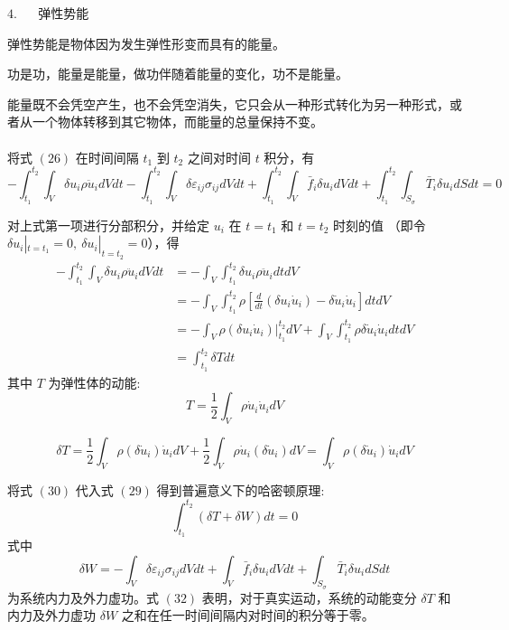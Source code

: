 \documentclass[12pt,a4paper]{article}
\begin{document}
$4$. ~~ 弹性势能

弹性势能是物体因为发生弹性形变而具有的能量。

功是功，能量是能量，做功伴随着能量的变化，功不是能量。

能量既不会凭空产生，也不会凭空消失，它只会从一种形式转化为另一种形式，或者从一个物体转移到其它物体，而能量的总量保持不变。\\

~ \\

将式 $(26)$ 在时间间隔 $t_1$ 到 $t_2$ 之间对时间 $t$ 积分，有
\begin{equation}
-\int_{t_1}^{t_2} \int_{V}\delta u_i\rho\ddot{u}_idVdt-\int_{t_1}^{t_2} \int_{V}\delta\varepsilon_{ij}\sigma_{ij}dVdt+\int_{t_1}^{t_2} \int_{V}\bar{f}_i\delta u_idVdt+\int_{t_1}^{t_2} \int_{S_{\sigma}}\bar{T}_i\delta u_idSdt=0
\end{equation}

对上式第一项进行分部积分，并给定 $u_i$ 在 $t=t_1$ 和 $t=t_2$ 时刻的值 （即令 $\delta u_i|_{t=t_1}=0,~\delta u_i|_{t=t_2}=0$），得
\begin{equation}
\begin{align}
-\int_{t_1}^{t_2} \int_{V}\delta u_i\rho\ddot{u}_idVdt & = -\int_{V} \int_{t_1}^{t_2}\delta u_i\rho\ddot{u}_idtdV \\
& = -\int_{V} \int_{t_1}^{t_2}\rho\left[\frac{d}{dt}(\delta u_i\dot{u}_i)-\delta\dot{u}_i\dot{u}_i\right]dtdV \\
& = -\int_{V}\rho(\delta u_i\dot{u}_i)|^{t_2}_{t_1}dV+\int_{V} \int_{t_1}^{t_2}\rho\delta\dot{u}_i\dot{u}_idtdV \\
& = \int_{t_1}^{t_2} \delta Tdt
\end{align}
\end{equation}
其中 $T$ 为弹性体的动能:
\begin{equation}
T=\frac{1}{2}\int_{V}\rho\dot{u}_i\dot{u}_idV
\end{equation}

$$
\delta T=\frac{1}{2}\int_{V}\rho(\delta\dot{u}_i)\dot{u}_idV+\frac{1}{2}\int_{V}\rho\dot{u}_i(\delta\dot{u}_i)dV=\int_{V}\rho(\delta\dot{u}_i)\dot{u}_idV
$$

将式 $(30)$ 代入式 $(29)$ 得到普遍意义下的哈密顿原理:
\begin{equation}
\int_{t_1}^{t_2} (\delta T+\delta W)dt=0
\end{equation}
式中
\begin{equation}
\delta W=-\int_{V}\delta\varepsilon_{ij}\sigma_{ij}dVdt+\int_{V}\bar{f}_i\delta u_idVdt+\int_{S_{\sigma}}\bar{T}_i\delta u_idSdt
\end{equation}
为系统内力及外力虚功。式 $(32)$ 表明，对于真实运动，系统的动能变分 $\delta T$ 和内力及外力虚功 $\delta W$ 之和在任一时间间隔内对时间的积分等于零。
\end{document}
